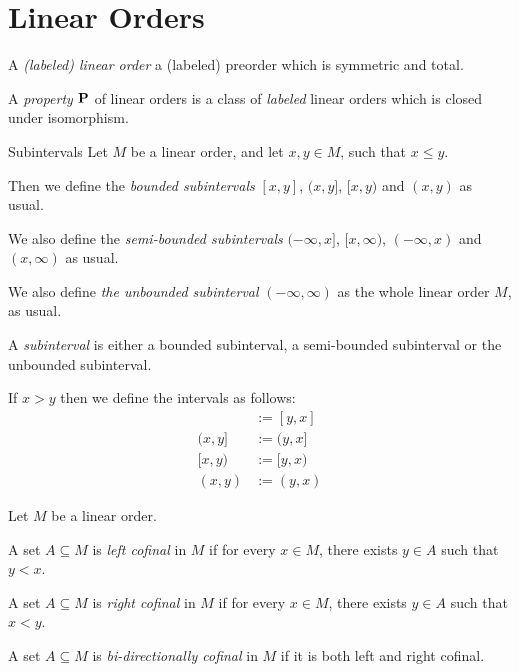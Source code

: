 \section{Linear Orders}

\begin{definitions}
  A \emph{(labeled) linear order} a (labeled) preorder which is symmetric and total.
\end{definitions}

\begin{definition}
  A \emph{property} $\mathbf{P}$ of linear orders is a class of \emph{labeled} linear orders which
  is closed under isomorphism.
\end{definition}

\begin{definition}{Subintervals}
  Let $M$ be a linear order,
  and let $x, y \in M$, such that $x \le y$.

  Then we define the \emph{bounded subintervals} $[x, y]$,
  $(x, y]$, $[x, y)$ and $(x, y)$ as usual.

          We also define the \emph{semi-bounded subintervals} $(-\infty, x]$,
  $[x, \infty)$, $(-\infty, x)$ and $(x, \infty)$ as usual.

  We also define \emph{the unbounded subinterval} $(-\infty, \infty)$ as the whole linear order $M$,
  as usual.

  A \emph{subinterval} is either
  a bounded subinterval, a semi-bounded subinterval or the unbounded subinterval.

  If $x > y$ then we define the intervals as follows:
  \begin{align*}
    [x, y] & := [y, x] \\
    (x, y] & := (y, x] \\
    [x, y) & := [y, x) \\
    (x, y) & := (y, x)
  \end{align*}

\end{definition}

\begin{definition}
  Let $M$ be a linear order.

  A set $A \subseteq M$ is \emph{left cofinal} in $M$ if for every $x \in M$,
  there exists $y \in A$ such that $y < x$.

  A set $A \subseteq M$ is \emph{right cofinal} in $M$ if for every $x \in M$,
  there exists $y \in A$ such that $x < y$.

  A set $A \subseteq M$ is \emph{bi-directionally cofinal} in $M$ if it is both left and right cofinal.
\end{definition}

